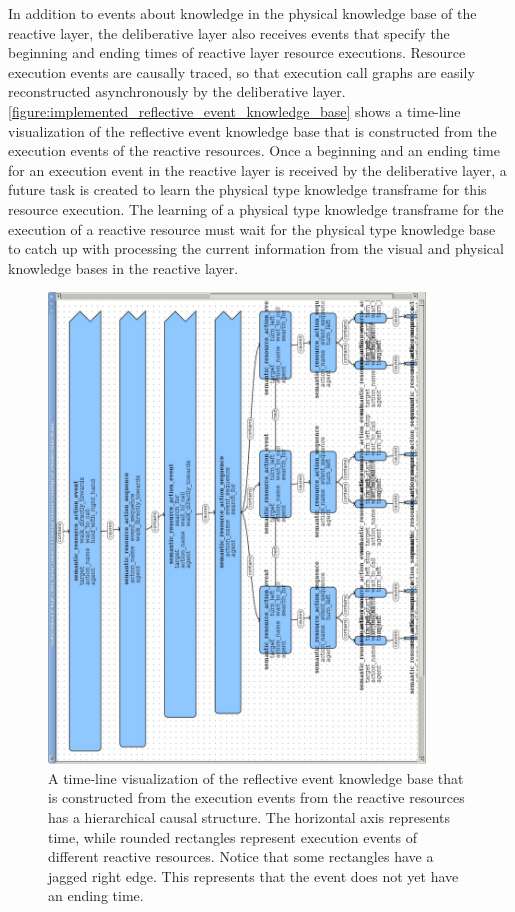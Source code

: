 In addition to events about knowledge in the physical knowledge base
of the reactive layer, the deliberative layer also receives events
that specify the beginning and ending times of reactive layer resource
executions.  Resource execution events are causally traced, so that
execution call graphs are easily reconstructed asynchronously by the
deliberative layer.
{\mbox{\autoref{figure:implemented_reflective_event_knowledge_base}}}
shows a time-line visualization of the reflective event knowledge base
that is constructed from the execution events of the reactive
resources.  Once a beginning and an ending time for an execution event
in the reactive layer is received by the deliberative layer, a future
task is created to learn the physical type knowledge transframe for
this resource execution.  The learning of a physical type knowledge
transframe for the execution of a reactive resource must wait for the
physical type knowledge base to catch up with processing the current
information from the visual and physical knowledge bases in the
reactive layer.
\begin{figure}
\begin{center}
\includegraphics[width=10cm]{gfx/implemented_reflective_event_knowledge_base}
\end{center}
\caption[A time-line visualization of the reflective event knowledge
  base that is constructed from the execution events from the reactive
  resources.]{A time-line visualization of the reflective event
  knowledge base that is constructed from the execution events from
  the reactive resources has a hierarchical causal structure.  The
  horizontal axis represents time, while rounded rectangles represent
  execution events of different reactive resources.  Notice that some
  rectangles have a jagged right edge.  This represents that the event
  does not yet have an ending time.}
\label{figure:implemented_reflective_event_knowledge_base}
\end{figure}

